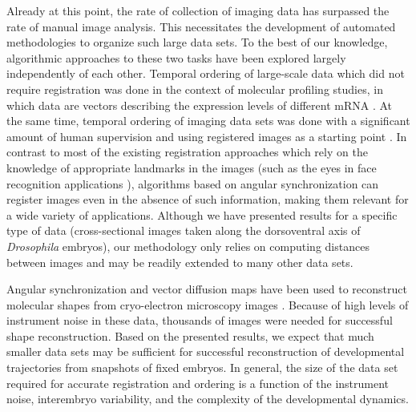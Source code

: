 \documentclass{pnastwo}
\begin{document}
\begin{article}
Already at this point, the rate of collection of imaging data has surpassed the rate of manual image analysis.
%
This necessitates the development of automated methodologies to organize such large data sets. 
%
To the best of our knowledge, algorithmic approaches to these two tasks have been explored largely independently of each other. 
%
Temporal ordering of large-scale data which did not require registration was done in the context of molecular profiling studies, in which data are vectors describing the expression levels of different mRNA \cite{anavy2014blind, trapnell2014dynamics, gupta2008extracting}.
%
At the same time, temporal ordering of imaging data sets was done with a significant amount of human supervision and using registered images as a starting point \cite{yuan2014automated, surkova2008characterization}.  
%
%
In contrast to most of the existing registration approaches which rely on the knowledge of appropriate landmarks in the images \cite{ian1998statistical} (such as the eyes in face recognition applications \cite{zhao2003face}), algorithms based on angular synchronization can register images even in the absence of such information, making them relevant for a wide variety of applications. 
%
Although we have presented results for a specific type of data (cross-sectional images taken along the dorsoventral axis of {\em Drosophila} embryos), our methodology only relies on computing distances between images and may be readily extended to many other data sets. 

Angular synchronization and vector diffusion maps have been used to reconstruct molecular shapes from cryo-electron microscopy images \cite{singer2012vector, zhao2014rotationally, singer2011viewing}.
%
Because of high levels of instrument noise in these data, thousands of images were needed for successful shape reconstruction. 
%
Based on the presented results, we expect that much smaller data sets may be sufficient for successful reconstruction of developmental trajectories from snapshots of fixed embryos.
%
In general, the size of the data set required for accurate registration and ordering is a function of the instrument noise, interembryo variability, and the complexity of the developmental dynamics.
%


\end{article}
\end{document}

